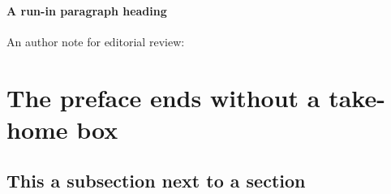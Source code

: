 \paragraph{A run-in paragraph heading} \lipsum[21]

An author note for editorial review: 

\lipsum[22]

\section{The preface ends without a take-home box}

\subsection{This a subsection next to a section}

\lipsum[23-24]